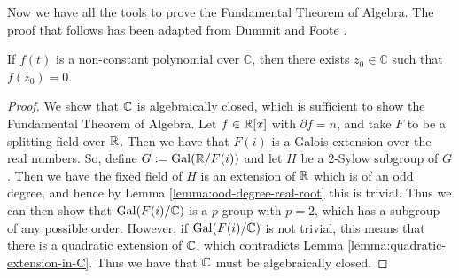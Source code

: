 Now we have all the tools to prove the Fundamental Theorem of Algebra. The proof that follows has been adapted from Dummit and Foote \cite{foote-algebra}.

\begin{theorem}
    If $f(t)$ is a non-constant polynomial over $\mathbb{C}$, then there exists $z_0 \in \mathbb{C}$ such that $f\left(z_0\right)=0$.
\end{theorem}

\begin{proof}
    We show that $\mathbb C$ is algebraically closed, which is sufficient to show the Fundamental Theorem of Algebra. Let $f \in \mathbb R[x]$ with $\partial f = n$, and take $F$ to be a splitting field over $\mathbb R$. Then we have that $F(i)$ is a Galois extension over the real numbers. So, define $G:=\operatorname{Gal}(\mathbb R/F(i))$ and let $H$ be a $2$-Sylow subgroup of $G$. Then we have the fixed field of $H$ is an extension of $\mathbb R$ which is of an odd degree, and hence by Lemma \ref{lemma:ood-degree-real-root} this is trivial. Thus we can then show that $\operatorname{Gal}(F(i)/\mathbb C)$ is a $p$-group with $p=2$, which has a subgroup of any possible order. However, if $\operatorname{Gal}(F(i)/\mathbb C)$ is not trivial, this means that there is a quadratic extension of $\mathbb C$, which contradicts Lemma \ref{lemma:quadratic-extension-in-C}. Thus we have that $\mathbb C$ must be algebraically closed.
\end{proof}

